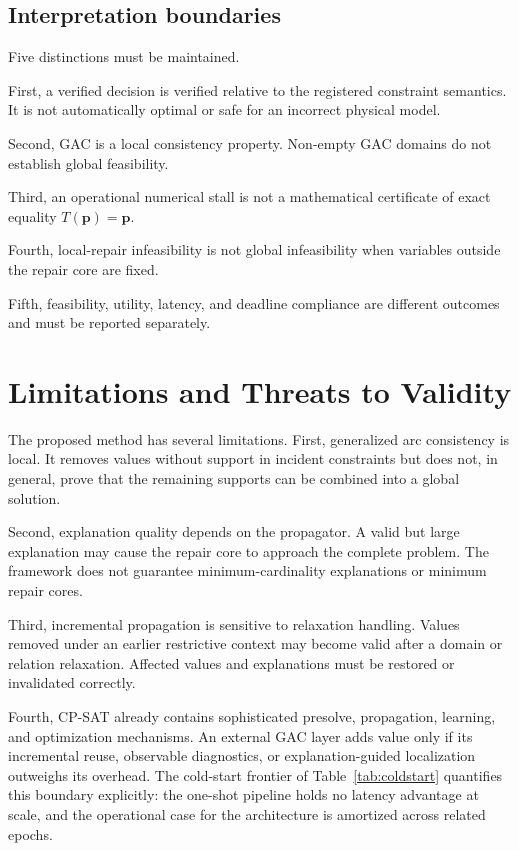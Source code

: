 \documentclass[pdflatex,sn-mathphys-num,iicol,oneside]{sn-jnl}
\begin{document}
\subsection{Interpretation boundaries}

Five distinctions must be maintained.

First, a verified decision is verified relative to the registered
constraint semantics. It is not automatically optimal or safe for an
incorrect physical model.

Second, GAC is a local consistency property. Non-empty GAC domains do
not establish global feasibility.

Third, an operational numerical stall is not a mathematical
certificate of exact equality $T(\bm{p})=\bm{p}$.

Fourth, local-repair infeasibility is not global infeasibility when
variables outside the repair core are fixed.

Fifth, feasibility, utility, latency, and deadline compliance are
different outcomes and must be reported separately.

\section{Limitations and Threats to Validity}
\label{sec:limitations}

The proposed method has several limitations. First, generalized arc consistency is local. It removes values without
support in incident constraints but does not, in general, prove that
the remaining supports can be combined into a global solution.

Second, explanation quality depends on the propagator. A valid but
large explanation may cause the repair core to approach the complete
problem. The framework does not guarantee minimum-cardinality
explanations or minimum repair cores.

Third, incremental propagation is sensitive to relaxation handling.
Values removed under an earlier restrictive context may become valid
after a domain or relation relaxation. Affected values and explanations
must be restored or invalidated correctly.

Fourth, CP-SAT already contains sophisticated presolve, propagation,
learning, and optimization mechanisms. An external GAC layer adds
value only if its incremental reuse, observable diagnostics, or
explanation-guided localization outweighs its overhead. The cold-start
frontier of Table~\ref{tab:coldstart} quantifies this boundary
explicitly: the one-shot pipeline holds no latency advantage at scale,
and the operational case for the architecture is amortized across
related epochs.
\end{document}
